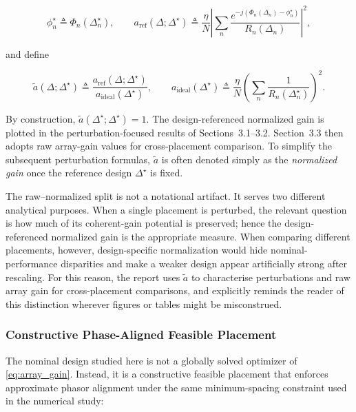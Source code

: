 \begin{equation}
\phi_n^\star \triangleq \Phi_n(\Delta_n^\star),
\qquad
a_{\mathrm{ref}}(\Delta;\Delta^\star)
\triangleq
\frac{\eta}{N}
\left|
\sum_n \frac{e^{-j(\Phi_n(\Delta_n)-\phi_n^\star)}}{R_n(\Delta_n)}
\right|^2,
\label{eq:a_ref}
\end{equation}

and define

\begin{equation}
\tilde{a}(\Delta;\Delta^\star)
\triangleq
\frac{a_{\mathrm{ref}}(\Delta;\Delta^\star)}{a_{\mathrm{ideal}}(\Delta^\star)},
\qquad
a_{\mathrm{ideal}}(\Delta^\star)
\triangleq
\frac{\eta}{N}
\left(
\sum_n \frac{1}{R_n(\Delta_n^\star)}
\right)^2.
\label{eq:a_tilde}
\end{equation}

By construction, $\tilde{a}(\Delta^\star;\Delta^\star)=1$. The design-referenced normalized gain is plotted in the perturbation-focused results of Sections~3.1--3.2. Section~3.3 then adopts raw array-gain values for cross-placement comparison. To simplify the subsequent perturbation formulas, $\tilde{a}$ is often denoted simply as the \emph{normalized gain} once the reference design $\Delta^\star$ is fixed.

The raw–normalized split is not a notational artifact. It serves two different analytical purposes. When a single placement is perturbed, the relevant question is how much of its coherent-gain potential is preserved; hence the design-referenced normalized gain is the appropriate measure. When comparing different placements, however, design-specific normalization would hide nominal-performance disparities and make a weaker design appear artificially strong after rescaling. For this reason, the report uses $\tilde{a}$ to characterise perturbations and raw array gain for cross-placement comparisons, and explicitly reminds the reader of this distinction wherever figures or tables might be misconstrued.

\subsubsection{Constructive Phase-Aligned Feasible Placement}

The nominal design studied here is not a globally solved optimizer of \eqref{eq:array_gain}. Instead, it is a constructive feasible placement that enforces approximate phasor alignment under the same minimum-spacing constraint used in the numerical study:

